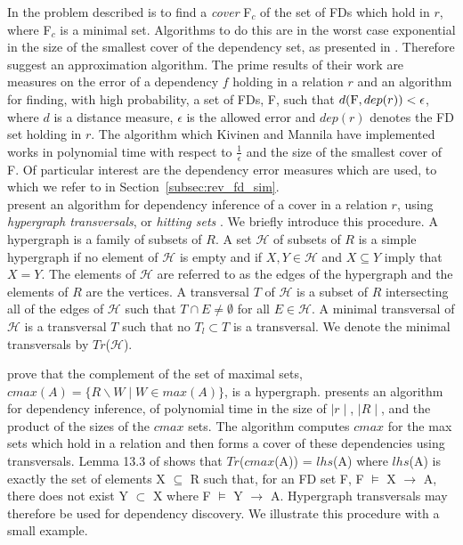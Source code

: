 In \cite{km95} the problem described is to find a {\em cover} F$_c$ of the
set of FDs which hold in $r$, where F$_c$
is a minimal set. Algorithms to do this
are in the worst case exponential in the size of the smallest cover of
the dependency set, as presented in \cite{mr94}. Therefore \cite{km95} suggest an approximation algorithm.  The prime results of
their work are measures on the error of a dependency $f$ holding in a
relation $r$ and an algorithm for finding, with high probability, a set of FDs, F, such
that $d({\rm F}, dep(r)) < \epsilon$, where $d$ is a distance measure,
$\epsilon$ is the allowed error and $dep(r)$ denotes the FD set
holding in $r$.  The algorithm which Kivinen and Mannila have implemented
works in polynomial time with respect to $\frac{1}{\epsilon}$ and the
size of the smallest cover of F.
Of particular interest are the dependency error measures which are
used, to which we refer to in Section~\ref{subsec:rev_fd_sim}.\\

\cite{mr92} present an algorithm for dependency inference of a cover
in a relation $r$, using
{\em hypergraph transversals}, or {\em hitting sets} \cite{eg95}. We briefly
introduce this procedure. A hypergraph is a family of subsets of
$R$. A set ${\mathcal H}$ of subsets of $R$ is a 
simple hypergraph if no element of  ${\mathcal H}$ is empty and if $X, Y \in
{\mathcal H}$ and $X \subseteq Y$ imply that $X = Y$. The elements of
${\mathcal H}$ are referred to as the edges of the
hypergraph and the elements of $R$ are the vertices. A transversal $T$
of ${\mathcal H}$ is a subset of $R$ intersecting 
all of the edges of ${\mathcal H}$ such that $T \cap E \not=
\emptyset$ for all $E \in {\mathcal H}$.  A minimal transversal of
${\mathcal H}$ is a transversal $T$ such that no $T_l \subset T$ is a
transversal. We denote the minimal transversals by $Tr$(${\mathcal
H}$).

\smallskip
\cite{Mann92} prove that the complement of the set of
maximal sets, $cmax(A) = \{ R \backslash W \mid W \in max(A) \}$, is a
hypergraph. 
 \cite{Mann92} presents an algorithm for
dependency inference, of polynomial time in the size of $\mid r
\mid$, $\mid R \mid$, and the product 
of the sizes of the $cmax$ sets. The algorithm computes $cmax$ for the max sets
which hold in a relation and then forms a cover of these
dependencies using transversals. Lemma 13.3 of \cite{Mann92} shows
that $Tr$($cmax$(A)) = $lhs$(A) where $lhs$(A) is exactly the set of
elements X $\subseteq$ R such that, for an FD set F, F $\models$ X
$\to$ A, there does not exist Y $\subset$ X where F $\models$ Y
$\to$ A. Hypergraph transversals may therefore be used for dependency
discovery. We illustrate this procedure with a small example.


